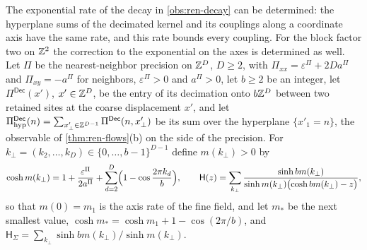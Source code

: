 The exponential rate of the decay in \cref{obs:ren-decay} can be determined: the hyperplane sums of the decimated kernel and its couplings along a coordinate axis have the same rate, and this rate bounds every coupling. For the block factor two on $\mathbb{Z}^2$ the correction to the exponential on the axes is determined as well. Let $\Pi$ be the nearest-neighbor precision on $\mathbb{Z}^D$, $D\ge2$, with $\Pi_{xx}=\varepsilon^\Pi+2Da^\Pi$ and $\Pi_{xy}=-a^\Pi$ for neighbors, $\varepsilon^\Pi>0$ and $a^\Pi>0$, let $b\ge2$ be an integer, let $\Pi^{\mathsf{Dec}}(x')$, $x'\in\mathbb{Z}^D$, be the entry of its decimation onto $b\mathbb{Z}^D$ between two retained sites at the coarse displacement $x'$, and let $\Pi^{\mathsf{Dec}}_{\mathrm{hyp}}(n)=\sum_{x'_\perp\in\mathbb{Z}^{D-1}}\Pi^{\mathsf{Dec}}(n,x'_\perp)$ be its sum over the hyperplane $\{x'_1=n\}$, the observable of \cref{thm:ren-flows}(b) on the side of the precision. For $k_\perp=(k_2,\dots,k_D)\in\{0,\dots,b-1\}^{D-1}$ define $m(k_\perp)>0$ by
\begin{equation}\label{eq:ren-decay-masses}
\cosh m(k_\perp)=1+\frac{\varepsilon^\Pi}{2a^\Pi}+\sum_{d=2}^D\Bigl(1-\cos\frac{2\pi k_d}b\Bigr),\qquad\mathsf H(z)=\sum_{k_\perp}\frac{\sinh bm(k_\perp)}{\sinh m(k_\perp)\bigl(\cosh bm(k_\perp)-z\bigr)},
\end{equation}
so that $m(0)=m_1$ is the axis rate of the fine field, and let $m_\ast$ be the next smallest value, $\cosh m_\ast=\cosh m_1+1-\cos(2\pi/b)$, and $\mathsf H_\Sigma=\sum_{k_\perp}\sinh bm(k_\perp)/\sinh m(k_\perp)$.

